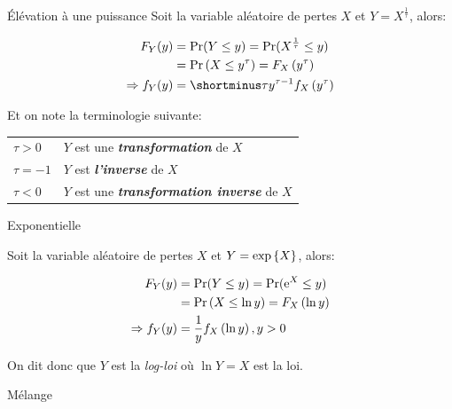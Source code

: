 \documentclass[10pt, french]{article}
\begin{document}
\begin{multicols*}{3}
\begin{algo}{Élévation à une puissance}
Soit la variable aléatoire de pertes $X$ et $Y = X^{\frac{1}{\tau}}$, alors:

\begin{align*}
	F_Y(y)
	&=	\Pr(Y \leq y)	
	=	\Pr(X^{\frac{1}{\tau}} \leq y)	\\
	&=	\Pr\left(X \leq y^{\tau}\right)	
	=	F_X\left(y^{\tau}\right)	\\
\Rightarrow	f_Y(y)
	&=	\shortminus \tau y^{\tau - 1} f_X\left(y^{\tau}\right)
\end{align*}

Et on note la terminologie suivante:

\begin{tabular}{|l | l |}
\hline
	$\tau > 0$	&	$Y$ est une \textit{\textbf{transformation}} de $X$	\\
	$\tau = -1$	&	$Y$ est \textit{\textbf{l'inverse}} de $X$	\\
	$\tau < 0$	&	$Y$ est une \textit{\textbf{transformation inverse}} de $X$	\\	\hline
\end{tabular}

\end{algo}

\begin{algo}{Exponentielle}

Soit la variable aléatoire de pertes $X$ et $Y = \text{exp}\left\{X\right\}$, alors:

\begin{align*}
	F_Y(y)
	&=	\Pr(Y \leq y)	
	=	\Pr(\mathrm{e}^{X} \leq y)	\\
	&=	\Pr\left(X \leq \ln y \right)	
	=	F_X\left(\ln y \right)	\\
\Rightarrow	f_Y(y)
	&=	\frac{1}{y} f_X\left(\ln y \right), y > 0
\end{align*}

On dit donc que $Y$ est la \textit{log-loi} où $\ln Y = X$ est la loi.

\end{algo}

\begin{algo}{Mélange}

\end{algo}

%

%


\end{multicols*}
\end{document}
